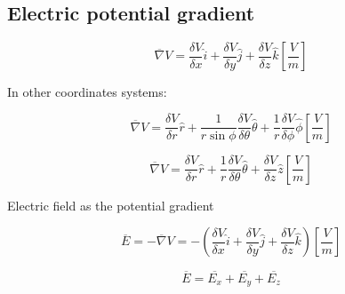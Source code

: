 \documentclass[letterpaper]{article}
\newcommand{\divline}{\noindent\makebox[\linewidth]{\rule{\textwidth}{0.4pt}}}
\begin{document}
    \divline
    \begin{multicols}{2}
        \section{Electric potential gradient}

        \[\overline{\nabla} V = \frac{\delta V}{\delta x} \hat{i} + \frac{\delta V}{\delta y} \hat{j} + \frac{\delta V}{\delta z} \hat{k} \left[ \frac{V}{m} \right] \]

        In other coordinates systems:

        \[\overline{\nabla} V = \frac{\delta V}{\delta r} \hat{r} + \frac{1}{r \sin{\phi}} \frac{\delta V}{\delta \theta} \hat{\theta} + \frac{1}{r} \frac{\delta V}{\delta \phi} \hat{\phi} \left[ \frac{V}{m} \right] \]

        \[\overline{\nabla} V = \frac{\delta V}{\delta r} \hat{r} + \frac{1}{r} \frac{\delta V}{\delta \theta} \hat{\theta} + \frac{\delta V}{\delta z} \hat{z} \left[ \frac{V}{m} \right] \]

        Electric field as the potential gradient

        \[\overline{E} =   - \overline{\nabla} V =  - \left( \frac{\delta V}{\delta x} \hat{i} + \frac{\delta V}{\delta y} \hat{j} + \frac{\delta V}{\delta z} \hat{k} \right) \left[ \frac{V}{m} \right] \]

        \[\overline{E} = \overline{E_{x}} + \overline{E_{y}} + \overline{E_{z}} \]
        
        
    \end{multicols}
    
\end{document}
